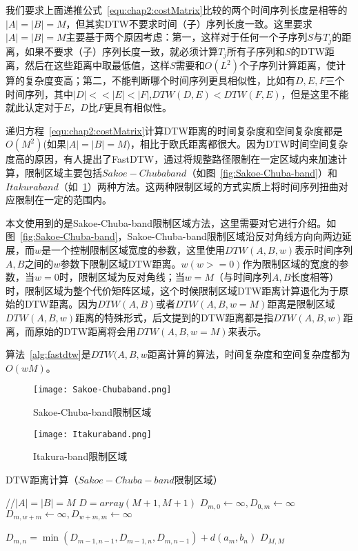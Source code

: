 我们要求上面递推公式~\ref{equ:chap2:costMatrix}比较的两个时间序列长度是相等的$|A|=|B|= M$，但其实DTW不要求时间（子）序列长度一致。这里要求$|A|=|B|= M$主要基于两个原因考虑：第一，这样对于任何一个子序列$S$与$T_j$的距离，如果不要求（子）序列长度一致，就必须计算$T_j$所有子序列和$S$的DTW距离，然后在这些距离中取最低值，这样$S$需要和$O(L^2)$个子序列计算距离，使计算的复杂度变高；第二，不能判断哪个时间序列更具相似性，比如有$D,E,F$三个时间序列，其中$|D|<<|E|<|F|$,$DTW(D,E) < DTW(F,E)$，但是这里不能就此认定对于$E$，$D$比$F$更具有相似性。

递归方程~\ref{equ:chap2:costMatrix}计算DTW距离的时间复杂度和空间复杂度都是$O(M^2)$(如果$|A|=|B|=M$)，相比于欧氏距离都很大。因为DTW时间空间复杂度高的原因，有人提出了FastDTW\cite{salvador2007toward}，通过将规整路径限制在一定区域内来加速计算，限制区域主要包括$Sakoe-Chuba band$（如图~\ref{fig:Sakoe-Chuba-band}）和$Itakura band$（如~\ref{fig:Itakura-band}）两种方法。这两种限制区域的方式实质上将时间序列扭曲对应限制在一定的范围内。

本文使用到的是Sakoe-Chuba-band限制区域方法，这里需要对它进行介绍。如图~\ref{fig:Sakoe-Chuba-band}，Sakoe-Chuba-band限制区域沿反对角线方向向两边延展，而$w$是一个控制限制区域宽度的参数，这里使用$DTW(A,B,w)$表示时间序列$A,B$之间的$w$参数下限制区域DTW距离。$w(w>=0)$作为限制区域的宽度的参数，当$w=0$时，限制区域为反对角线；当$w=M$（与时间序列$A,B$长度相等）时，限制区域为整个代价矩阵区域，这个时候限制区域DTW距离计算退化为于原始的DTW距离。因为$DTW(A,B)$或者$DTW(A,B,w=M)$距离是限制区域$DTW(A,B,w)$距离的特殊形式，后文提到的DTW距离都是指$DTW(A,B,w)$距离，而原始的DTW距离将会用$DTW(A,B,w=M)$来表示。

算法~\ref{alg:fastdtw}是$DTW(A,B,w$距离计算的算法，时间复杂度和空间复杂度都为$O(wM)$。

\begin{figure}
	\begin{minipage}{0.48\textwidth}
		\centering
		\texttt{[image: Sakoe-Chubaband.png]}
		\caption{Sakoe-Chuba-band限制区域}
		\label{fig:Sakoe-Chuba-band}
	\end{minipage}\hfill
	\begin{minipage}{0.48\textwidth}
		\centering
		\texttt{[image: Itakuraband.png]}
		\caption{Itakura-band限制区域}
		\label{fig:Itakura-band}
	\end{minipage}
\end{figure}



\begin{algorithm}
	\caption{DTW距离计算（$Sakoe-Chuba-band$限制区域）}
	\label{alg:fastdtw}
	\begin{algorithmic}[1]
		  //$|A|=|B|=M$
			\State $D = array(M+1,M+1)$
					\State $D_{m,0} \gets \infty, D_{0,m} \gets \infty$
				\Else
					\State $D_{m,w+m} \gets \infty, D_{w+m,m} \gets \infty$
				\EndIf
			\EndFor
			
					\State $D_{m,n} = \min(D_{m-1,n-1},D_{m-1,n},D_{m,n-1}) + d(a_m,b_n)$
				\EndFor
			\EndFor
			\State \Return $D_{M,M}$
		\EndFunction
	\end{algorithmic}
\end{algorithm}

